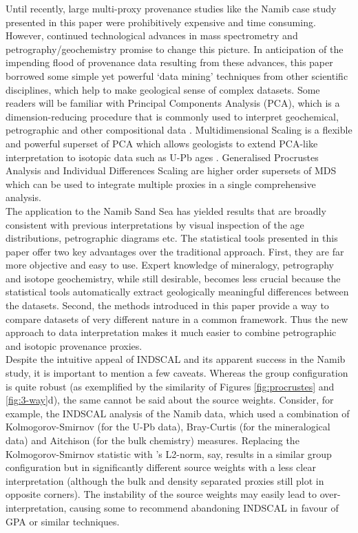 \documentclass{article}
\begin{document}
Until recently, large multi-proxy provenance studies like the Namib
case study presented in this paper were prohibitively expensive and
time consuming.  However, continued technological advances in mass
spectrometry \citep{frei2009} and petrography/geochemistry
\citep{allen2012} promise to change this picture.  In anticipation of
the impending flood of provenance data resulting from these advances,
this paper borrowed some simple yet powerful `data mining' techniques
from other scientific disciplines, which help to make geological sense
of complex datasets.  Some readers will be familiar with Principal
Components Analysis (PCA), which is a dimension-reducing procedure
that is commonly used to interpret geochemical, petrographic and other
compositional data \citep{aitchison1983,
  vermeesch2013}. Multidimensional Scaling is a flexible and powerful
superset of PCA which allows geologists to extend PCA-like
interpretation to isotopic data such as U-Pb ages
\citep{vermeesch2013}. Generalised Procrustes Analysis and Individual
Differences Scaling are higher order supersets of MDS which can be
used to integrate multiple proxies in a single comprehensive
analysis.\\

The application to the Namib Sand Sea has yielded results that are
broadly consistent with previous interpretations by visual inspection
of the age distributions, petrographic diagrams etc. The statistical
tools presented in this paper offer two key advantages over the
traditional approach.  First, they are far more objective and easy to
use. Expert knowledge of mineralogy, petrography and isotope
geochemistry, while still desirable, becomes less crucial because the
statistical tools automatically extract geologically meaningful
differences between the datasets.  Second, the methods introduced in
this paper provide a way to compare datasets of very different nature
in a common framework.  Thus the new approach to data interpretation
makes it much easier to combine petrographic and isotopic provenance
proxies.\\

Despite the intuitive appeal of INDSCAL and its apparent success in
the Namib study, it is important to mention a few caveats. Whereas the
group configuration is quite robust (as exemplified by the similarity
of Figures \ref{fig:procrustes} and \ref{fig:3-way}d), the same cannot
be said about the source weights.  Consider, for example, the INDSCAL
analysis of the Namib data, which used a combination of
Kolmogorov-Smirnov (for the U-Pb data), Bray-Curtis (for the
mineralogical data) and Aitchison (for the bulk chemistry)
measures. Replacing the Kolmogorov-Smirnov statistic with
\citep{sircombe2004a}'s L2-norm, say, results in a similar group
configuration but in significantly different source weights with a
less clear interpretation (although the bulk and density separated
proxies still plot in opposite corners). The instability of the source
weights may easily lead to over-interpretation, causing some
\citep[e.g.,][]{borg2005} to recommend abandoning INDSCAL in favour of
GPA or similar techniques.\\
\end{document}
